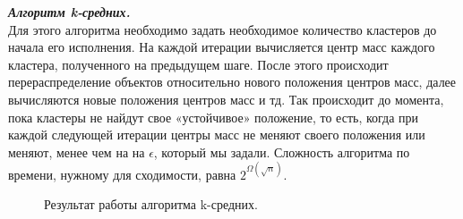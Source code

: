 \documentclass[12pt, a4paper]{article}
\begin{document}
\textit{\textbf{Алгоритм k-средних.}}\\Для этого алгоритма необходимо задать необходимое количество кластеров до начала его исполнения. На каждой итерации вычисляется центр масс каждого кластера, полученного на предыдущем шаге. После этого происходит перераспределение объектов относительно нового положения центров масс, далее вычисляются новые положения центров масс и тд. Так происходит до момента, пока кластеры не найдут свое «устойчивое» положение, то есть, когда при каждой следующей итерации центры масс не меняют своего положения или меняют, менее чем на на $\epsilon$, который мы задали. Сложность алгоритма по времени, нужному для сходимости, равна $2^{\Omega(\sqrt{n})}.$
\begin{figure}[h!]
\caption{Результат работы алгоритма k-средних.}
\label{fig:k}
\end{figure}
\medskip 
 \medskip 
  \medskip 
   \medskip 
   
\end{document}
